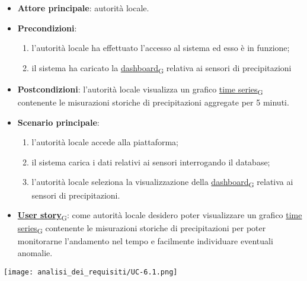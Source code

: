 \begin{itemize}
	\item \textbf{Attore principale}: autorità locale.
	\item \textbf{Precondizioni}:
	      \begin{enumerate}
		      \item l'autorità locale ha effettuato l'accesso al sistema ed esso è in funzione;
		      \item il sistema ha caricato la \href{https://7last.github.io/docs/pb/documentazione-interna/glossario\#dashboard}{dashboard\textsubscript{G}} relativa ai sensori di precipitazioni
	      \end{enumerate}
	\item \textbf{Postcondizioni}: l'autorità locale visualizza un grafico \href{https://7last.github.io/docs/pb/documentazione-interna/glossario\#time-series}{time series\textsubscript{G}} contenente le misurazioni storiche
	      di precipitazioni aggregate per 5 minuti.
	\item \textbf{Scenario principale}:
	      \begin{enumerate}
		      \item l'autorità locale accede alla piattaforma;
		      \item il sistema carica i dati relativi ai sensori interrogando il database;
		      \item l'autorità locale seleziona la visualizzazione della \href{https://7last.github.io/docs/pb/documentazione-interna/glossario\#dashboard}{dashboard\textsubscript{G}} relativa ai sensori di precipitazioni.
	      \end{enumerate}
	\item \href{https://7last.github.io/docs/pb/documentazione-interna/glossario\#user-story}{\textbf{User story}\textsubscript{G}}:
	      come autorità locale desidero poter visualizzare un grafico \href{https://7last.github.io/docs/pb/documentazione-interna/glossario\#time-series}{time series\textsubscript{G}} contenente le misurazioni storiche
	      di precipitazioni per poter monitorarne l'andamento nel tempo e facilmente individuare eventuali anomalie.
\end{itemize}
\begin{center}
	\texttt{[image: analisi\_dei\_requisiti/UC-6.1.png]}
\end{center}


